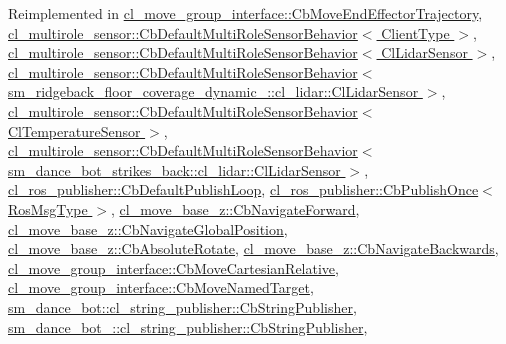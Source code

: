 Reimplemented in \hyperlink{classcl__move__group__interface_1_1CbMoveEndEffectorTrajectory_a4952c092e69bc6e9831568de32888da5}{cl\+\_\+move\+\_\+group\+\_\+interface\+::\+Cb\+Move\+End\+Effector\+Trajectory}, \hyperlink{classcl__multirole__sensor_1_1CbDefaultMultiRoleSensorBehavior_a0f400c7e29d0cb1dda11242a5a922f4c}{cl\+\_\+multirole\+\_\+sensor\+::\+Cb\+Default\+Multi\+Role\+Sensor\+Behavior$<$ Client\+Type $>$}, \hyperlink{classcl__multirole__sensor_1_1CbDefaultMultiRoleSensorBehavior_a0f400c7e29d0cb1dda11242a5a922f4c}{cl\+\_\+multirole\+\_\+sensor\+::\+Cb\+Default\+Multi\+Role\+Sensor\+Behavior$<$ Cl\+Lidar\+Sensor $>$}, \hyperlink{classcl__multirole__sensor_1_1CbDefaultMultiRoleSensorBehavior_a0f400c7e29d0cb1dda11242a5a922f4c}{cl\+\_\+multirole\+\_\+sensor\+::\+Cb\+Default\+Multi\+Role\+Sensor\+Behavior$<$ sm\+\_\+ridgeback\+\_\+floor\+\_\+coverage\+\_\+dynamic\+\_\+::cl\+\_\+lidar\+::\+Cl\+Lidar\+Sensor $>$}, \hyperlink{classcl__multirole__sensor_1_1CbDefaultMultiRoleSensorBehavior_a0f400c7e29d0cb1dda11242a5a922f4c}{cl\+\_\+multirole\+\_\+sensor\+::\+Cb\+Default\+Multi\+Role\+Sensor\+Behavior$<$ Cl\+Temperature\+Sensor $>$}, \hyperlink{classcl__multirole__sensor_1_1CbDefaultMultiRoleSensorBehavior_a0f400c7e29d0cb1dda11242a5a922f4c}{cl\+\_\+multirole\+\_\+sensor\+::\+Cb\+Default\+Multi\+Role\+Sensor\+Behavior$<$ sm\+\_\+dance\+\_\+bot\+\_\+strikes\+\_\+back\+::cl\+\_\+lidar\+::\+Cl\+Lidar\+Sensor $>$}, \hyperlink{classcl__ros__publisher_1_1CbDefaultPublishLoop_a206c6bc09e7c6414304b679ec415c19f}{cl\+\_\+ros\+\_\+publisher\+::\+Cb\+Default\+Publish\+Loop}, \hyperlink{classcl__ros__publisher_1_1CbPublishOnce_ad82cb7d6ac69fe9b91bc955550ab92cb}{cl\+\_\+ros\+\_\+publisher\+::\+Cb\+Publish\+Once$<$ Ros\+Msg\+Type $>$}, \hyperlink{classcl__move__base__z_1_1CbNavigateForward_a2160484562ef5fb1c655fab7f990241e}{cl\+\_\+move\+\_\+base\+\_\+z\+::\+Cb\+Navigate\+Forward}, \hyperlink{classcl__move__base__z_1_1CbNavigateGlobalPosition_a5c18268af1e7fc236aa155a58345d5d7}{cl\+\_\+move\+\_\+base\+\_\+z\+::\+Cb\+Navigate\+Global\+Position}, \hyperlink{classcl__move__base__z_1_1CbAbsoluteRotate_a0e362b8e9f0d7de5aeee183ba4031437}{cl\+\_\+move\+\_\+base\+\_\+z\+::\+Cb\+Absolute\+Rotate}, \hyperlink{classcl__move__base__z_1_1CbNavigateBackwards_a92858e20e6401051203f5dfa4aef60dc}{cl\+\_\+move\+\_\+base\+\_\+z\+::\+Cb\+Navigate\+Backwards}, \hyperlink{classcl__move__group__interface_1_1CbMoveCartesianRelative_a4ec79f1b62ddd8ecabf1f63aabb69013}{cl\+\_\+move\+\_\+group\+\_\+interface\+::\+Cb\+Move\+Cartesian\+Relative}, \hyperlink{classcl__move__group__interface_1_1CbMoveNamedTarget_ae7e89742c903577b71790370714047d8}{cl\+\_\+move\+\_\+group\+\_\+interface\+::\+Cb\+Move\+Named\+Target}, \hyperlink{classsm__dance__bot_1_1cl__string__publisher_1_1CbStringPublisher_ac93cc1eb150140331cb3e560ec8249e2}{sm\+\_\+dance\+\_\+bot\+::cl\+\_\+string\+\_\+publisher\+::\+Cb\+String\+Publisher}, \hyperlink{classsm__dance__bot__2_1_1cl__string__publisher_1_1CbStringPublisher_aee990acdb5ec33f1d22efafbe32216f2}{sm\+\_\+dance\+\_\+bot\+\_\+::cl\+\_\+string\+\_\+publisher\+::\+Cb\+String\+Publisher}, 